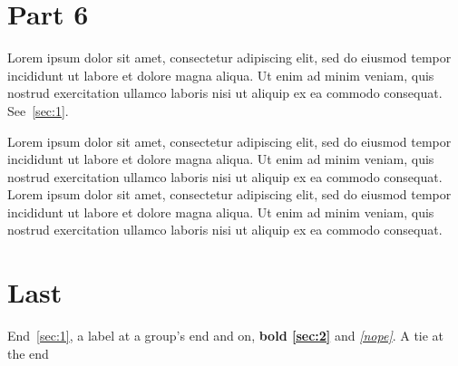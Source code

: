 \documentclass{article}
\begin{document}
\section{Part 6}\label{sec:6}
Lorem ipsum dolor sit amet, consectetur adipiscing elit, sed do eiusmod tempor incididunt ut labore et dolore magna aliqua. Ut enim ad minim veniam, quis nostrud exercitation ullamco laboris nisi ut aliquip ex ea commodo consequat. See~\ref{sec:1}.

Lorem ipsum dolor sit amet, consectetur adipiscing elit, sed do eiusmod tempor incididunt ut labore et dolore magna aliqua. Ut enim ad minim veniam, quis nostrud exercitation ullamco laboris nisi ut aliquip ex ea commodo consequat. Lorem ipsum dolor sit amet, consectetur adipiscing elit, sed do eiusmod tempor incididunt ut labore et dolore magna aliqua. Ut enim ad minim veniam, quis nostrud exercitation ullamco laboris nisi ut aliquip ex ea commodo consequat.

\section{Last}\label{sec:last}
End~\ref{sec:1}, \textmd{a label at a group's end \label{g}} and on, \textbf{bold \ref{sec:2}} and \emph{\ref{nope}}.
A tie at the end~
\end{document}
